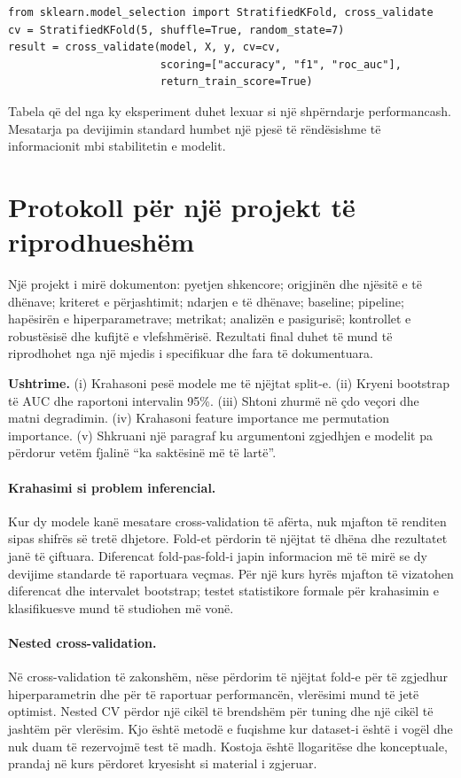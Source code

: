 \documentclass[12pt,a4paper,oneside]{book}
\begin{document}
\begin{lstlisting}
from sklearn.model_selection import StratifiedKFold, cross_validate
cv = StratifiedKFold(5, shuffle=True, random_state=7)
result = cross_validate(model, X, y, cv=cv,
                        scoring=["accuracy", "f1", "roc_auc"],
                        return_train_score=True)
\end{lstlisting}
Tabela që del nga ky eksperiment duhet lexuar si një shpërndarje performancash. Mesatarja pa devijimin standard humbet një pjesë të rëndësishme të informacionit mbi stabilitetin e modelit.

\section{Protokoll për një projekt të riprodhueshëm}

Një projekt i mirë dokumenton: pyetjen shkencore; origjinën dhe njësitë e të dhënave; kriteret e përjashtimit; ndarjen e të dhënave; baseline; pipeline; hapësirën e hiperparametrave; metrikat; analizën e pasigurisë; kontrollet e robustësisë dhe kufijtë e vlefshmërisë. Rezultati final duhet të mund të riprodhohet nga një mjedis i specifikuar dhe fara të dokumentuara.

\textbf{Ushtrime.} (i) Krahasoni pesë modele me të njëjtat split-e. (ii) Kryeni bootstrap të AUC dhe raportoni intervalin 95\%. (iii) Shtoni zhurmë në çdo veçori dhe matni degradimin. (iv) Krahasoni feature importance me permutation importance. (v) Shkruani një paragraf ku argumentoni zgjedhjen e modelit pa përdorur vetëm fjalinë ``ka saktësinë më të lartë''.


\paragraph{Krahasimi si problem inferencial.}
Kur dy modele kanë mesatare cross-validation të afërta, nuk mjafton të renditen sipas shifrës së tretë dhjetore. Fold-et përdorin të njëjtat të dhëna dhe rezultatet janë të çiftuara. Diferencat fold-pas-fold-i japin informacion më të mirë se dy devijime standarde të raportuara veçmas. Për një kurs hyrës mjafton të vizatohen diferencat dhe intervalet bootstrap; testet statistikore formale për krahasimin e klasifikuesve mund të studiohen më vonë.

\paragraph{Nested cross-validation.}
Në cross-validation të zakonshëm, nëse përdorim të njëjtat fold-e për të zgjedhur hiperparametrin dhe për të raportuar performancën, vlerësimi mund të jetë optimist. Nested CV përdor një cikël të brendshëm për tuning dhe një cikël të jashtëm për vlerësim. Kjo është metodë e fuqishme kur dataset-i është i vogël dhe nuk duam të rezervojmë test të madh. Kostoja është llogaritëse dhe konceptuale, prandaj në kurs përdoret kryesisht si material i zgjeruar.
\end{document}
